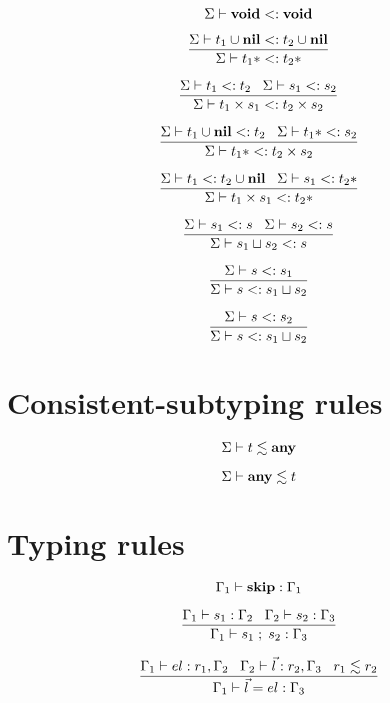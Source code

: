 \[
\Sigma \vdash \mathbf{void} <: \mathbf{void}
\]

\[
\dfrac{\Sigma \vdash t_{1} \cup \mathbf{nil} <: t_{2} \cup \mathbf{nil}}
      {\Sigma \vdash t_{1}* <: t_{2}*}
\]

\[
\dfrac{\Sigma \vdash t_{1} <: t_{2} \;\;\;
       \Sigma \vdash s_{1} <: s_{2}}
      {\Sigma \vdash t_{1} \times s_{1} <: t_{2} \times s_{2}}
\]

\[
\dfrac{\Sigma \vdash t_{1} \cup \mathbf{nil} <: t_{2} \;\;\;
       \Sigma \vdash t_{1}* <: s_{2}}
      {\Sigma \vdash t_{1}* <: t_{2} \times s_{2}}
\]

\[
\dfrac{\Sigma \vdash t_{1} <: t_{2} \cup \mathbf{nil} \;\;\;
       \Sigma \vdash s_{1} <: t_{2}*}
      {\Sigma \vdash t_{1} \times s_{1} <: t_{2}*}
\]

\[
\dfrac{\Sigma \vdash s_{1} <: s \;\;\;
       \Sigma \vdash s_{2} <: s}
      {\Sigma \vdash s_{1} \sqcup s_{2} <: s}
\]

\[
\dfrac{\Sigma \vdash s <: s_{1}}
      {\Sigma \vdash s <: s_{1} \sqcup s_{2}}
\]

\[
\dfrac{\Sigma \vdash s <: s_{2}}
      {\Sigma \vdash s <: s_{1} \sqcup s_{2}}
\]

\section{Consistent-subtyping rules}

\noindent

\[
\Sigma \vdash t \lesssim \mathbf{any}
\]

\[
\Sigma \vdash \mathbf{any} \lesssim t
\]

\section{Typing rules}

\noindent

\[
\Gamma_{1} \vdash \mathbf{skip}:\Gamma_{1}
\]

\[
\dfrac{\Gamma_{1} \vdash s_{1}:\Gamma_{2} \;\;\;
       \Gamma_{2} \vdash s_{2}:\Gamma_{3}}
      {\Gamma_{1} \vdash s_{1} \; ; \; s_{2}:\Gamma_{3}}
\]

\[
\dfrac{\Gamma_{1} \vdash el:r_{1}, \Gamma_{2} \;\;\;
       \Gamma_{2} \vdash \vec{l}:r_{2}, \Gamma_{3} \;\;\;
       r_{1} \lesssim r_{2}}
      {\Gamma_{1} \vdash \vec{l} = el:\Gamma_{3}}
\]

